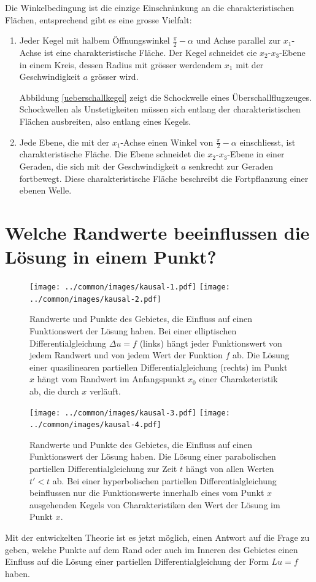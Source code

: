 Die Winkelbedingung ist die einzige Einschränkung an
die charakteristischen Flächen,  entsprechend gibt es eine
grosse Vielfalt:
\begin{enumerate}
\item
Jeder Kegel mit halbem Öffnungswinkel $\frac{\pi}2-\alpha$
und Achse parallel zur $x_1$-Achse ist eine charakteristische Fläche.
Der Kegel schneidet cie $x_2$-$x_3$-Ebene in einem Kreis, dessen Radius mit
grösser werdendem $x_1$ mit der Geschwindigkeit $a$ grösser wird.

Abbildung \ref{ueberschallkegel}
zeigt die Schockwelle eines Überschallflugzeuges. Schockwellen
als Unstetigkeiten müssen sich entlang der charakteristischen Flächen ausbreiten,
also entlang eines Kegels.
\item 
Jede Ebene, die mit der $x_1$-Achse einen Winkel von $\frac\pi2-\alpha$
einschliesst, ist charakteristische Fläche.
Die Ebene schneidet die $x_2$-$x_3$-Ebene in einer Geraden, die sich
mit der Geschwindigkeit $a$ senkrecht zur Geraden fortbewegt.
Diese charakteristische Fläche beschreibt die Fortpflanzung einer
ebenen Welle.
\end{enumerate}


\section{Welche Randwerte beeinflussen die Lösung in einem Punkt?}
\begin{figure}
\centering
\texttt{[image: ../common/images/kausal-1.pdf]}\qquad\qquad%
\texttt{[image: ../common/images/kausal-2.pdf]}
\caption{Randwerte und Punkte des Gebietes, die Einfluss auf einen
Funktionswert der Lösung haben.
Bei einer elliptischen Differentialgleichung $\Delta u=f$
(links)
hängt jeder Funktionswert von jedem Randwert und von jedem Wert der
Funktion $f$ ab.
Die Lösung einer quasilinearen partiellen Differentialgleichung  (rechts)
im Punkt $x$ hängt vom Randwert im Anfangspunkt $x_0$ einer Charaketeristik
ab, die durch $x$ verläuft.
\label{einflussmenge1}}
\end{figure}
\begin{figure}
\centering
\texttt{[image: ../common/images/kausal-3.pdf]}\qquad\qquad%
\texttt{[image: ../common/images/kausal-4.pdf]}
\caption{Randwerte und Punkte des Gebietes, die Einfluss auf einen
Funktionswert der Lösung haben.
Die Lösung einer parabolischen partiellen Differentialgleichung
zur Zeit $t$ hängt von allen Werten $t'<t$ ab.
Bei einer hyperbolischen partiellen Differentialgleichung beinflussen 
nur die Funktionswerte innerhalb eines vom Punkt $x$ ausgehenden Kegels
von Charakteristiken den Wert der Lösung im Punkt $x$.
\label{einflussmenge2}}
\end{figure}
Mit der entwickelten Theorie ist es jetzt möglich, einen Antwort auf die
Frage zu geben, welche Punkte auf dem Rand oder auch im Inneren des Gebietes
einen Einfluss auf die Lösung einer partiellen Differentialgleichung
der Form $Lu=f$ haben.

